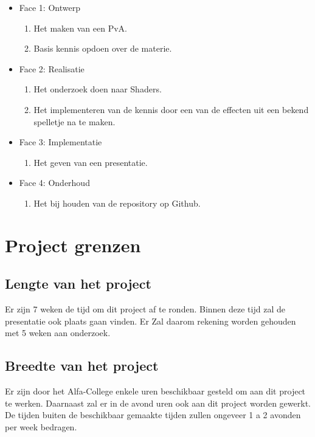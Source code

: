\documentclass[]{report}
\begin{document}
\begin{itemize}
	\item Face 1: Ontwerp
	\begin{enumerate}
		\item Het maken van een PvA.
		\item Basis kennis opdoen over de materie.
			\newline
	\end{enumerate} 
	
	\item Face 2: Realisatie
	\begin{enumerate}
		\item Het onderzoek doen naar Shaders.
		\item Het implementeren van de kennis door een van de effecten uit een bekend spelletje na te maken.
			\newline
	\end{enumerate} 
	
	\item Face 3: Implementatie
	\begin{enumerate} 
		\item Het geven van een presentatie.
		\newline
	\end{enumerate}

	\item Face 4: Onderhoud
	\begin{enumerate}
		\item Het bij houden van de repository op Github.
		\newline
	\end{enumerate}
\end{itemize} 





\chapter{Project grenzen}

\section{Lengte van het project}
Er zijn 7 weken de tijd om dit project af te ronden. Binnen deze tijd zal de presentatie ook plaats gaan vinden. Er Zal daarom rekening worden gehouden met 5 weken aan onderzoek.

\section{Breedte van het project}
Er zijn door het Alfa-College enkele uren beschikbaar gesteld om aan dit project te werken. Daarnaast zal er in de avond uren ook aan dit project worden gewerkt. De tijden buiten de beschikbaar gemaakte tijden zullen ongeveer 1 a 2 avonden per week bedragen. 
\end{document}
